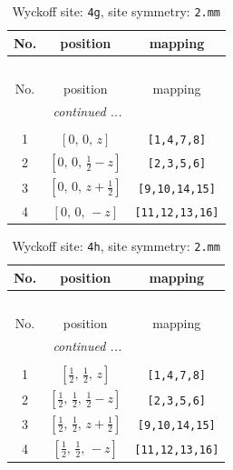 \documentclass[fleqn,8pt]{jsarticle}
\begin{document}
\renewcommand{\arraystretch}{1.2}
\begin{longtable}{ccc}
\caption{Wyckoff site: {\tt 4g}, site symmetry: {\tt 2.mm}}
 \\
 \hline \hline
No. & position & mapping \\ \hline \endfirsthead

\multicolumn{2}{l}{\tablename\ \thetable{}} \\
 \hline \hline
No. & position & mapping \\ \hline \endhead

 \hline \hline
\multicolumn{2}{r}{\footnotesize\it continued ...} \\ \endfoot

 \hline \hline
\multicolumn{2}{r}{} \\ \endlastfoot

1 & $\left[ 0,\, 0,\, z \right]$ & {\tt [1,4,7,8]} \\ \hline
2 & $\left[ 0,\, 0,\, \frac{1}{2} - z \right]$ & {\tt [2,3,5,6]} \\ \hline
3 & $\left[ 0,\, 0,\, z + \frac{1}{2} \right]$ & {\tt [9,10,14,15]} \\ \hline
4 & $\left[ 0,\, 0,\, - z \right]$ & {\tt [11,12,13,16]} \\
\end{longtable}
\renewcommand{\arraystretch}{1.2}
\begin{longtable}{ccc}
\caption{Wyckoff site: {\tt 4h}, site symmetry: {\tt 2.mm}}
 \\
 \hline \hline
No. & position & mapping \\ \hline \endfirsthead

\multicolumn{2}{l}{\tablename\ \thetable{}} \\
 \hline \hline
No. & position & mapping \\ \hline \endhead

 \hline \hline
\multicolumn{2}{r}{\footnotesize\it continued ...} \\ \endfoot

 \hline \hline
\multicolumn{2}{r}{} \\ \endlastfoot

1 & $\left[ \frac{1}{2},\, \frac{1}{2},\, z \right]$ & {\tt [1,4,7,8]} \\ \hline
2 & $\left[ \frac{1}{2},\, \frac{1}{2},\, \frac{1}{2} - z \right]$ & {\tt [2,3,5,6]} \\ \hline
3 & $\left[ \frac{1}{2},\, \frac{1}{2},\, z + \frac{1}{2} \right]$ & {\tt [9,10,14,15]} \\ \hline
4 & $\left[ \frac{1}{2},\, \frac{1}{2},\, - z \right]$ & {\tt [11,12,13,16]} \\
\end{longtable}
\end{document}
